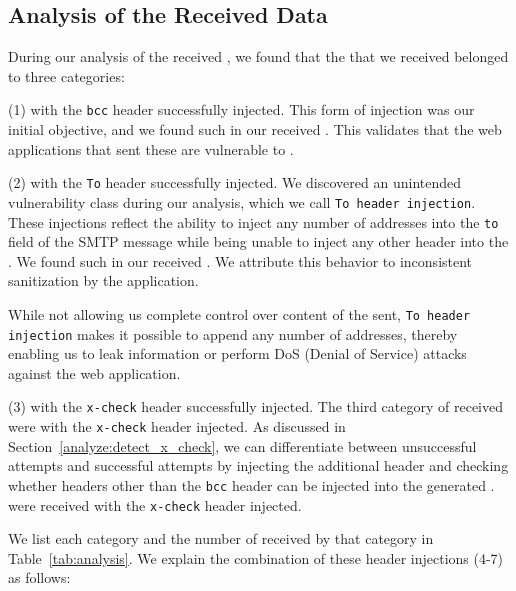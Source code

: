 
\subsection{Analysis of the Received \Email Data}

During our analysis of the received \emails, we found that the \emails that we received belonged to three categories:

(1) \Emails with the \texttt{bcc} header successfully injected. This form
of injection was our initial objective, and we found
\ehibcc such \emails in our received \emails. This validates that the
web applications that sent these \emails are vulnerable to \ehi.
	
(2) \Emails with the \texttt{To} header successfully injected. We
discovered an unintended vulnerability class during our analysis,
which we call \texttt{To~header injection}. These injections reflect
the ability to inject any number of \email addresses into the
\texttt{to} field of the SMTP message while being unable to inject any
other header into the \emails. We found \ehito such \emails in our
received \emails. We attribute this behavior to inconsistent
sanitization by the application.
   
While not allowing us complete control over content of the \emails
sent, \texttt{To header injection} makes it possible to append any
number of \email addresses, thereby enabling us to leak information or
perform DoS (Denial of Service) attacks against the web application.
	
(3) \Emails with the \texttt{x-check} header successfully injected. The
third category of \emails received were \emails with the
\texttt{x-check} header injected. As discussed in
Section~\ref{analyze:detect_x_check}, we can differentiate between
unsuccessful attempts and successful attempts by injecting the
additional header and checking whether headers other than the
\texttt{bcc} header can be injected into the generated \email.
\ehixcheck \emails were received with the \texttt{x-check} header
injected.

We list each category and the number of \emails received by that
category in Table~\ref{tab:analysis}. We explain the combination of
these header injections (4-7) as follows:



